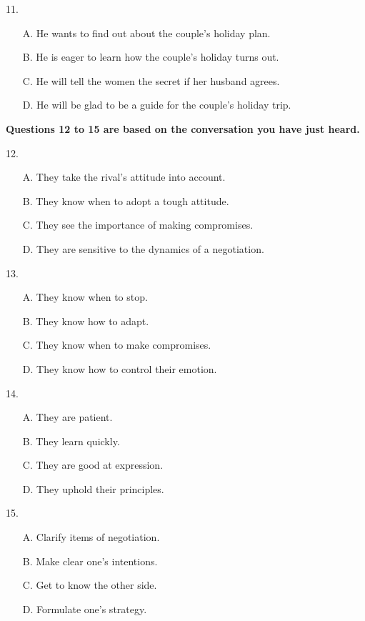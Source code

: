 \documentclass[UTF8,11pt]{ctexart}
\begin{document}
11.


\begin{itemize}[leftmargin=2em,itemsep=.2em,topsep=.4em]\item[A.] He wants to find out about the couple’s holiday plan.
\item[B.] He is eager to learn how the couple’s holiday turns out.
\item[C.] He will tell the women the secret if her husband agrees.
\item[D.] He will be glad to be a guide for the couple’s holiday trip.
\end{itemize}

\textbf{Questions 12 to 15 are based on the conversation you have just heard.}


12.


\begin{itemize}[leftmargin=2em,itemsep=.2em,topsep=.4em]\item[A.] They take the rival’s attitude into account.
\item[B.] They know when to adopt a tough attitude.
\item[C.] They see the importance of making compromises.
\item[D.] They are sensitive to the dynamics of a negotiation.
\end{itemize}

13.


\begin{itemize}[leftmargin=2em,itemsep=.2em,topsep=.4em]\item[A.] They know when to stop.
\item[B.] They know how to adapt.
\item[C.] They know when to make compromises.
\item[D.] They know how to control their emotion.
\end{itemize}

14.


\begin{itemize}[leftmargin=2em,itemsep=.2em,topsep=.4em]\item[A.] They are patient.
\item[B.] They learn quickly.
\item[C.] They are good at expression.
\item[D.] They uphold their principles.
\end{itemize}

15.


\begin{itemize}[leftmargin=2em,itemsep=.2em,topsep=.4em]\item[A.] Clarify items of negotiation.
\item[B.] Make clear one's intentions.
\item[C.] Get to know the other side.
\item[D.] Formulate one's strategy.
\end{itemize}
\end{document}
